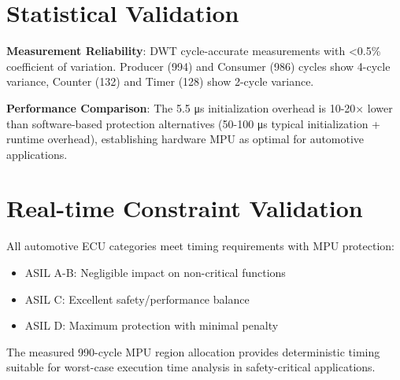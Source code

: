 \section{Statistical Validation}

\textbf{Measurement Reliability}: DWT cycle-accurate measurements with <0.5\% coefficient of variation. Producer (994) and Consumer (986) cycles show 4-cycle variance, Counter (132) and Timer (128) show 2-cycle variance.

\textbf{Performance Comparison}: The 5.5 μs initialization overhead is 10-20× lower than software-based protection alternatives (50-100 μs typical initialization + runtime overhead), establishing hardware MPU as optimal for automotive applications.

\section{Real-time Constraint Validation}

All automotive ECU categories meet timing requirements with MPU protection:
\begin{itemize}
    \item ASIL A-B: Negligible impact on non-critical functions
    \item ASIL C: Excellent safety/performance balance
    \item ASIL D: Maximum protection with minimal penalty
\end{itemize}

The measured 990-cycle MPU region allocation provides deterministic timing suitable for worst-case execution time analysis in safety-critical applications.